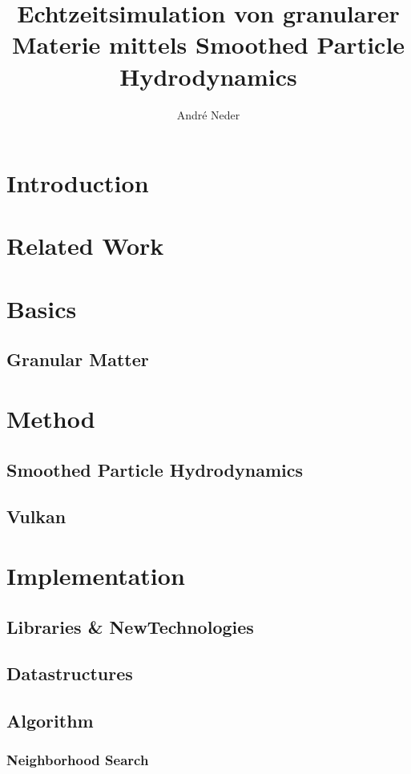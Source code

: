 \documentclass[intern]{cgMA}
\title{Echtzeitsimulation von granularer Materie mittels Smoothed Particle Hydrodynamics}
\author{André Neder}
\begin{document}
    \maketitle
    \newpage
    \tableofcontents
    \newpage
    \section{Introduction}
    \blindtext[1]
    \section{Related Work}
    \blindtext[1]
    \section{Basics}
    \subsection{Granular Matter}
    \blindtext[1]
    \section{Method}
    \subsection{Smoothed Particle Hydrodynamics}
    \blindtext[1]
    \subsection{Vulkan}
    \blindtext[1]
    \section{Implementation}
    \blindtext[1]
    \subsection{Libraries \& NewTechnologies}
    \blindtext[1]
    \subsection{Datastructures}
    \blindtext[1]
    \subsection{Algorithm}
    \blindtext[1]
    \subsubsection{Neighborhood Search}
    \blindtext[1]
\end{document}

